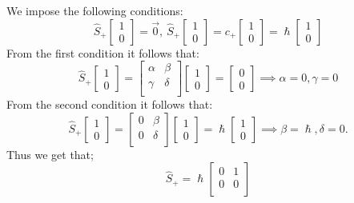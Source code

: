 \documentclass{article}
\begin{document}
We impose the following conditions:
$$\hat{S}_+ \begin{bmatrix}
    1 \\ 0
\end{bmatrix} = \Vec{0}, \ \hat{S}_+ \begin{bmatrix}
    1 \\ 0
\end{bmatrix} = c_+ \begin{bmatrix}
    1 \\ 0
\end{bmatrix} = \hslash \begin{bmatrix}
    1 \\ 0
\end{bmatrix}  
$$
From the first condition it follows that:
$$\hat{S}_+ \begin{bmatrix}
    1 \\ 0
\end{bmatrix} = \begin{bmatrix}
    \alpha & \beta \\ \gamma & \delta \\
\end{bmatrix} \begin{bmatrix}
    1 \\ 0
\end{bmatrix}= \begin{bmatrix}
    0 \\ 0
\end{bmatrix} \implies \alpha = 0, \gamma = 0$$
From the second condition it follows that:
$$\hat{S}_+ \begin{bmatrix}
    1 \\ 0
\end{bmatrix} = \begin{bmatrix}
    0 & \beta \\ 0 & \delta \\
\end{bmatrix} \begin{bmatrix}
    1 \\ 0
\end{bmatrix}= \hslash \begin{bmatrix}
    1 \\ 0
\end{bmatrix} \implies \beta = \hslash, \delta = 0. $$
Thus we get that;
$$\hat{S}_+ = \hslash \begin{bmatrix}
    0 & 1 \\ 0 & 0 \\
\end{bmatrix}$$
\end{document}
